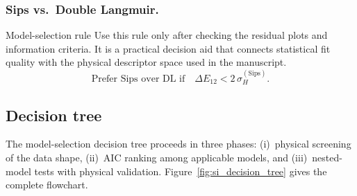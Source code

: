 \documentclass[journal=jacsat,manuscript=article]{achemso}
\begin{document}
\subsubsection{Sips vs.\ Double Langmuir.}
\begin{bluebox}{Model-selection rule}
	Use this rule only after checking the residual plots and information criteria. It is a practical decision aid that connects statistical fit quality with the physical descriptor space used in the manuscript.
\begin{equation}
	\text{Prefer Sips over DL if}\quad
		\Delta E_{12} < 2\,\sigma_H^{\mathrm{(Sips)}}.
	\label{eq:si_criterion_SvsDL}
\end{equation}
\end{bluebox}

\subsection{Decision tree}
\label{sec:si_decision_tree}

The model-selection decision tree proceeds in three phases:
(i)~physical screening of the data shape,
(ii)~AIC ranking among applicable models, and
(iii)~nested-model tests with physical validation.
Figure~\ref{fig:si_decision_tree} gives the complete flowchart.
\end{document}
